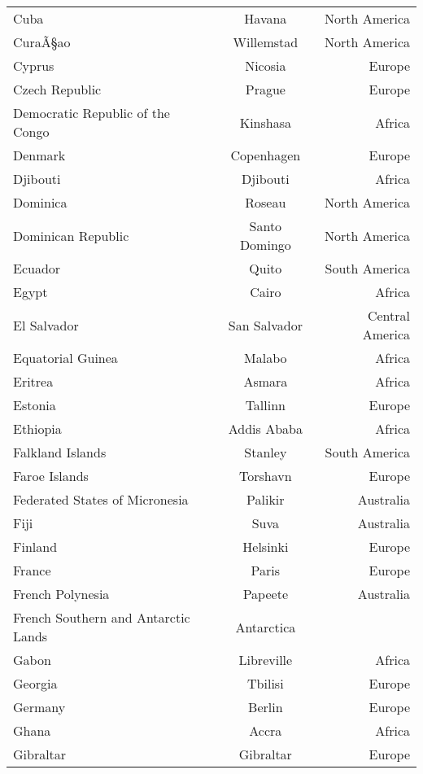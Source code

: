 \begin{longtable}{l|c|r}
Cuba            & Havana            & North America\\
CuraÃ§ao        & Willemstad        & North America\\
Cyprus          & Nicosia           & Europe\\
Czech Republic  & Prague            & Europe\\
Democratic Republic of the Congo & Kinshasa & Africa\\
Denmark	        & Copenhagen        & Europe\\
Djibouti        & Djibouti          & Africa\\
Dominica        & Roseau            & North America\\
Dominican Republic & Santo Domingo  & North America\\
Ecuador         & Quito             & South America\\
Egypt           & Cairo             & Africa\\
El Salvador     & San Salvador      & Central America\\
Equatorial Guinea & Malabo          & Africa\\
Eritrea         & Asmara            & Africa\\
Estonia         & Tallinn           & Europe\\
Ethiopia        & Addis Ababa       & Africa\\
Falkland Islands & Stanley          & South America\\
Faroe Islands   & Torshavn          & Europe\\
Federated States of Micronesia & Palikir & Australia\\
Fiji            & Suva              & Australia\\
Finland         & Helsinki          & Europe\\
France          & Paris             & Europe\\
French Polynesia & Papeete          & Australia\\
French Southern and Antarctic Lands & Antarctica\\
Gabon           & Libreville        & Africa\\
Georgia         & Tbilisi           & Europe\\
Germany         & Berlin            & Europe\\
Ghana           & Accra             & Africa\\
Gibraltar       & Gibraltar         & Europe\\

\end{longtable}
